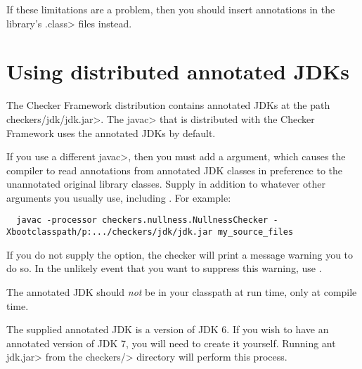 If these limitations are a problem, then you should insert annotations
in the library's \<.class> files instead.



\section{Using distributed annotated JDKs\label{skeleton-using}\label{skeleton}}

The Checker Framework distribution contains
annotated JDKs at the path \<checkers/jdk/jdk.jar>.
The \<javac> that is distributed with the Checker Framework uses the
annotated JDKs by default.

If you use a different \<javac>, then you must add a
 argument, which causes the compiler to read
annotations from annotated JDK classes in preference to the unannotated
original library classes.  Supply  in addition to
whatever other arguments you usually use, including .  For example:

\begin{smaller}
\begin{Verbatim}
  javac -processor checkers.nullness.NullnessChecker -Xbootclasspath/p:.../checkers/jdk/jdk.jar my_source_files
\end{Verbatim}
\end{smaller}

If you do not supply the  option, the checker will
print a message warning you to do so.  In the unlikely event that you want
to suppress this warning, use .


The annotated JDK should \emph{not} be in your classpath at run time, only
at compile time.

The supplied annotated JDK is a version of JDK 6.  If you wish to have an
annotated version of JDK 7, you will need to create it yourself.  Running
\<ant jdk.jar> from the \<checkers/> directory will perform this process.





